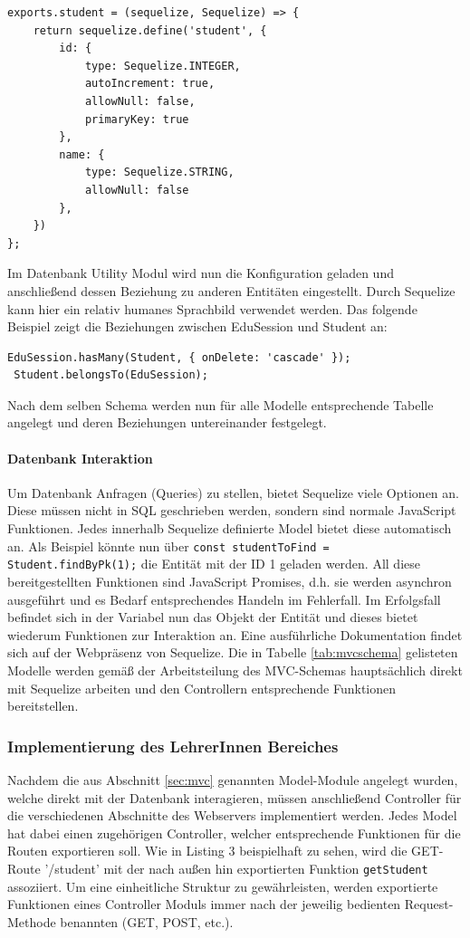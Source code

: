  \begin{lstlisting}[caption=Anlegen einer Tabelle und deren Beziehungen]
exports.student = (sequelize, Sequelize) => {
	return sequelize.define('student', {
		id: {
			type: Sequelize.INTEGER,
			autoIncrement: true,
			allowNull: false,
			primaryKey: true
		},
		name: {
			type: Sequelize.STRING,
			allowNull: false
		},
	})
};
 \end{lstlisting}
 Im Datenbank Utility Modul wird nun die Konfiguration geladen und anschließend dessen Beziehung zu anderen Entitäten eingestellt. Durch Sequelize kann hier ein relativ humanes Sprachbild verwendet werden. Das folgende Beispiel zeigt die Beziehungen zwischen EduSession und Student an:
 \begin{lstlisting}[caption=Konfiguration von Entitätsbeziehungen]
 EduSession.hasMany(Student, { onDelete: 'cascade' });
 Student.belongsTo(EduSession);
 \end{lstlisting}
 Nach dem selben Schema werden nun für alle Modelle entsprechende Tabelle angelegt und deren Beziehungen untereinander festgelegt. 
 \paragraph{Datenbank Interaktion}
 Um Datenbank Anfragen (Queries) zu stellen, bietet Sequelize viele Optionen an. Diese müssen nicht in SQL geschrieben werden, sondern sind normale JavaScript Funktionen. Jedes innerhalb Sequelize definierte Model bietet diese automatisch an. Als Beispiel könnte nun über 
 \texttt{const studentToFind = Student.findByPk(1);} die Entität mit der ID 1 geladen werden. All diese bereitgestellten Funktionen sind JavaScript Promises, d.h. sie werden asynchron ausgeführt und es Bedarf entsprechendes Handeln im Fehlerfall.
 Im Erfolgsfall befindet sich in der Variabel nun das Objekt der Entität und dieses bietet wiederum Funktionen zur Interaktion an. Eine ausführliche Dokumentation findet sich auf der Webpräsenz von Sequelize. 
 Die in Tabelle \ref{tab:mvcschema} gelisteten Modelle werden gemäß der Arbeitsteilung des MVC-Schemas hauptsächlich direkt mit Sequelize arbeiten und den Controllern entsprechende Funktionen bereitstellen.
 \subsubsection{Implementierung des LehrerInnen Bereiches}\label{sec:implementlehrer}
 Nachdem die aus Abschnitt \ref{sec:mvc} genannten Model-Module angelegt wurden, welche direkt mit der Datenbank interagieren, müssen anschließend Controller für die verschiedenen Abschnitte des Webservers implementiert werden. Jedes Model hat dabei einen zugehörigen Controller, welcher entsprechende Funktionen für die Routen exportieren soll. Wie in Listing 3 beispielhaft zu sehen, wird die GET-Route '/student' mit der nach außen hin exportierten Funktion \texttt{getStudent} assoziiert. Um eine einheitliche Struktur zu gewährleisten, werden exportierte Funktionen eines Controller Moduls immer nach der jeweilig bedienten Request-Methode benannten (GET, POST, etc.). \\
